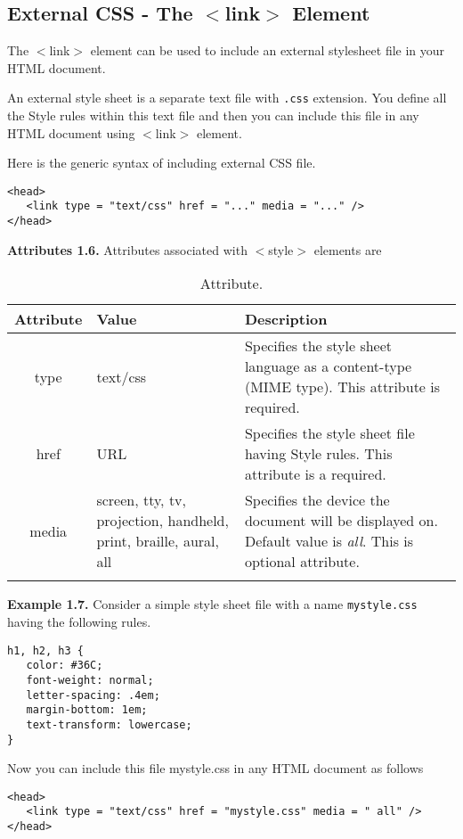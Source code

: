 \documentclass[a4paper,oneside]{book}
\numberwithin{equation}{chapter}
\begin{document}
\subsection{External CSS - The $<$link$>$ Element}
The $<$link$>$ element can be used to include an external stylesheet file in your HTML document.

An external style sheet is a separate text file with \texttt{.css} extension. You define all the Style rules within this text file and then you can include this file in any HTML document using $<$link$>$ element.

Here is the generic syntax of including external CSS file.
\begin{verbatim}
<head>
   <link type = "text/css" href = "..." media = "..." />
</head>
\end{verbatim}
\textbf{Attributes 1.6.} Attributes associated with $<$style$>$ elements are
\begin{center}
\begin{longtable}{|c|p{3cm}|p{6cm}|}
\hline
\textbf{Attribute} & \textbf{Value} & \textbf{Description}\\
\hline
type & text/css & Specifies the style sheet language as a content-type (MIME type). This attribute is required.\\
\hline
href & URL & Specifies the style sheet file having Style rules. This attribute is a required.\\
\hline
media & screen, tty, tv, projection, handheld, print, braille, aural, all & Specifies the device the document will be displayed on. Default value is \textit{all}. This is optional attribute.\\
\hline
\caption{Attribute.} 
\end{longtable}
\end{center}
\textbf{Example 1.7.} Consider a simple style sheet file with a name \texttt{mystyle.css} having the following rules.
\begin{verbatim}
h1, h2, h3 {
   color: #36C;
   font-weight: normal;
   letter-spacing: .4em;
   margin-bottom: 1em;
   text-transform: lowercase;
}
\end{verbatim}
Now you can include this file mystyle.css in any HTML document as follows
\begin{verbatim}
<head>
   <link type = "text/css" href = "mystyle.css" media = " all" />
</head>
\end{verbatim}
\end{document}
